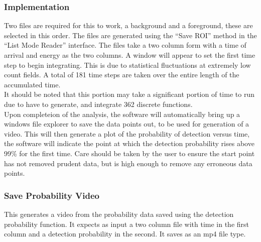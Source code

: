 \subsubsection{Implementation}
	Two files are required for this to work, a background and a foreground, these are selected in this order. The files are generated using the ``Save ROI'' method in the ``List Mode Reader'' interface. The files take a two column form with a time of arrival and energy as the two columns. A window will appear to set the first time step to begin integrating. This is due to statistical fluctuations at extremely low count fields. A total of 181 time steps are taken over the entire length of the accumulated time.\\ 
	
It should be noted that this portion may take a significant portion of time to run due to have to generate, and integrate 362 discrete functions. \\

Upon completeion of the analysis, the software will automatically bring up a windows file explorer to save the data points out, to be used for generation of a video. This will then generate a plot of the probability of detection versus time, the software will indicate the point at which the detection probability rises above 99\% for the first time. Care should be taken by the user to ensure the start point has not removed prudent data, but is high enough to remove any erroneous data points. 

\subsubsection{Save Probability Video}
	This generates a video from the probability data saved using the detection probability function. It expects as input a two column file with time in the first column and a detection probability in the second. It saves as an mp4 file type.



